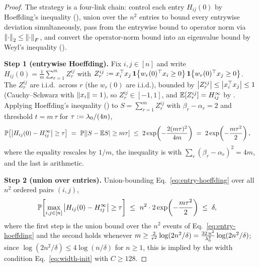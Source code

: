 \begin{proof}
The strategy is a four-link chain: control each entry $H_{ij}(0)$ by Hoeffding's inequality
(), union over the $n^2$ entries to bound every entrywise deviation
simultaneously, pass from the entrywise bound to operator norm via $\left\| \cdot \right\|_{2} \le
\left\| \cdot \right\|_{F}$, and convert the operator-norm bound into an eigenvalue bound by Weyl's
inequality ().

\smallskip\noindent\textbf{Step 1 (entrywise Hoeffding).}
Fix $i, j \in [n]$ and write $H_{ij}(0) = \tfrac{1}{m}\sum_{r=1}^m Z_r^{ij}$ with
$Z_r^{ij} := x_i^{\top} x_j\,\mathbf{1}\!\left\{w_r(0)^{\top} x_i \ge 0\right\}\mathbf{1}\!\left\{w_r(0)^{\top} x_j \ge 0\right\}$.
The $Z_r^{ij}$ are i.i.d.\ across $r$ (the $w_r(0)$ are i.i.d.), bounded by
$\left| Z_r^{ij} \right| \le \left| x_i^{\top} x_j \right| \le 1$ (Cauchy--Schwarz with $\left\| x_i \right\|=1$), so
$Z_r^{ij} \in [-1, 1]$, and $\mathbb{E}[Z_r^{ij}] = H^{\infty}_{ij}$ by . Applying
Hoeffding's inequality () to $S = \sum_{r=1}^m Z_r^{ij}$ with
$\beta_r - \alpha_r = 2$ and threshold $t = m\,\tau$ for $\tau := \lambda_{0}/(4n)$,
\begin{align}\label{eq:entry-hoeffding}
\mathbb{P}\!\left[ \left| H_{ij}(0) - H^{\infty}_{ij} \right| \ge \tau \right]
\;=\; & ~ \mathbb{P}\!\left[ \left| S - \mathbb{E} S \right| \ge m\tau \right]
\;\le\; 2\exp\!\left( - \frac{2 (m\tau)^2}{4m} \right)
\;=\; 2\exp\!\left( - \frac{m\tau^2}{2} \right),
\end{align}
where the equality rescales by $1/m$, the inequality is  with
$\sum_r (\beta_r - \alpha_r)^2 = 4m$, and the last is arithmetic.

\smallskip\noindent\textbf{Step 2 (union over entries).}
Union-bounding Eq.~\eqref{eq:entry-hoeffding} over all $n^2$ ordered pairs $(i,j)$,
\begin{align}\label{eq:entry-union}
\mathbb{P}\!\left[ \max_{i,j \in [n]} \left| H_{ij}(0) - H^{\infty}_{ij} \right| \ge \tau \right]
\;\le\; & ~ n^2 \cdot 2\exp\!\left( - \frac{m\tau^2}{2} \right)
\;\le\; \delta,
\end{align}
where the first step is the union bound over the $n^2$ events of Eq.~\eqref{eq:entry-hoeffding}
and the second holds whenever $m \ge \tfrac{2}{\tau^2}\log(2n^2/\delta)
= \tfrac{32\, n^2}{\lambda_{0}^2}\log(2n^2/\delta)$; since $\log(2n^2/\delta) \le 4\log(n/\delta)$
for $n \ge 1$, this is implied by the width condition Eq.~\eqref{eq:width-init} with
$C \ge 128$.


\end{proof}
